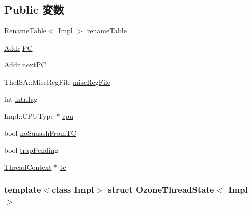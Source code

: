 \subsection*{Public 変数}
\begin{DoxyCompactItemize}
\item 
\hyperlink{classRenameTable}{RenameTable}$<$ Impl $>$ \hyperlink{structOzoneThreadState_af8d3f859e7c0dd9408ba99de6f415616}{renameTable}
\item 
\hyperlink{base_2types_8hh_af1bb03d6a4ee096394a6749f0a169232}{Addr} \hyperlink{structOzoneThreadState_ab4fee9d7e100be71a104b4b714909357}{PC}
\item 
\hyperlink{base_2types_8hh_af1bb03d6a4ee096394a6749f0a169232}{Addr} \hyperlink{structOzoneThreadState_a3bda64c96331af0ad914c5873b7074b5}{nextPC}
\item 
TheISA::MiscRegFile \hyperlink{structOzoneThreadState_a0b61a64e9ea4f2fb9bd5d726cd256caf}{miscRegFile}
\item 
int \hyperlink{structOzoneThreadState_a94e9e9794cd8eb8eac7573761a31414d}{intrflag}
\item 
Impl::CPUType $\ast$ \hyperlink{structOzoneThreadState_aa1c01120932caab88aa8c589c99e67a8}{cpu}
\item 
bool \hyperlink{structOzoneThreadState_afdfc33b720511483d84f7098ab6ba075}{noSquashFromTC}
\item 
bool \hyperlink{structOzoneThreadState_aa9f948437524f88e51afd737df505200}{trapPending}
\item 
\hyperlink{classThreadContext}{ThreadContext} $\ast$ \hyperlink{structOzoneThreadState_a4455a4759e69e5ebe68ae7298cbcc37d}{tc}
\end{DoxyCompactItemize}
\subsubsection*{template$<$class Impl$>$ struct OzoneThreadState$<$ Impl $>$}



